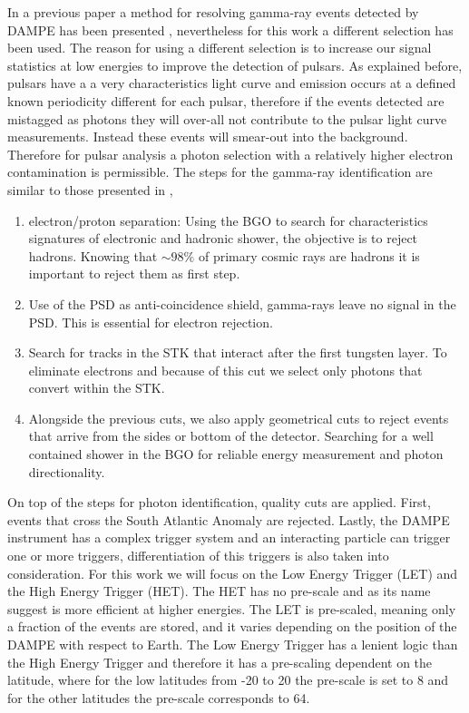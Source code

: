 \documentclass{PoS}
\begin{document}
In a previous paper  a method for resolving gamma-ray events detected by DAMPE has been presented \cite{zunlei}, nevertheless for this work a different selection has been used. The reason for using a different selection is to increase our signal statistics at low energies to improve the detection of pulsars. As explained before, pulsars have a a very characteristics light curve and emission occurs at a defined known periodicity different  for each pulsar, therefore if the events detected are mistagged as photons they will over-all not contribute to the pulsar light curve measurements. Instead these events will smear-out into the background. Therefore for pulsar analysis a photon selection with a relatively higher electron contamination is permissible. 
The steps for the gamma-ray identification are similar to those presented in \cite{zunlei},
\begin{enumerate}
	\item electron/proton separation: Using the BGO to search for characteristics signatures of electronic and hadronic shower, the objective is to reject hadrons. Knowing that $\sim 98\%$ of primary cosmic rays are hadrons it is important to reject them as first step. 
	\item Use of the PSD as anti-coincidence shield, gamma-rays leave no signal in the PSD. This is essential for electron rejection.
	\item Search for tracks in the STK that interact after the first tungsten layer. To eliminate electrons and because of this cut we select only photons that convert within the STK. 
	\item Alongside the previous cuts, we also apply geometrical cuts to reject events that arrive from the sides or bottom of the detector. Searching for a well contained shower in the BGO for reliable energy measurement and photon directionality.
	
\end{enumerate}

On top of the steps for photon identification, quality cuts are applied. First, events that cross the South Atlantic Anomaly are rejected. Lastly, the DAMPE instrument has a complex trigger system and an interacting particle can trigger one or more triggers, differentiation of this triggers is also taken into consideration. For this work we will focus on the Low Energy Trigger (LET) and the High Energy Trigger (HET). The HET has no pre-scale and as its name suggest is more efficient at higher energies. The LET is pre-scaled, meaning only a fraction of the events are stored,  and it varies depending on the position of the DAMPE with respect to Earth. The Low Energy Trigger has a lenient logic than the High Energy Trigger and therefore it has a pre-scaling dependent on the latitude, where for the low latitudes from -20 to 20 the pre-scale is set to 8 and for the other latitudes the pre-scale corresponds to 64. 
\end{document}
